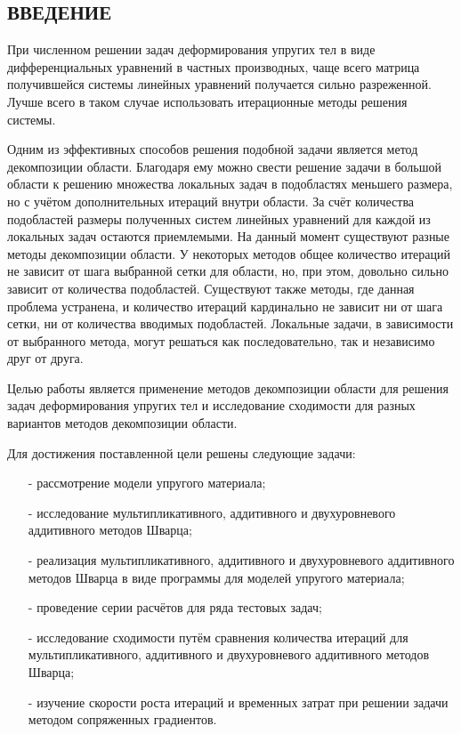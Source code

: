 \documentclass[a4paper]{article}
\begin{document}

\renewcommand*\contentsname{\begin{center}СОДЕРЖАНИЕ\end{center}}
	
\tableofcontents

\newpage

\begin{center}
\section*{\centering ВВЕДЕНИЕ}
\end{center}

При численном решении задач деформирования упругих тел в виде дифференциальных уравнений в частных производных, чаще всего матрица получившейся системы линейных уравнений получается сильно разреженной. Лучше всего в таком случае использовать итерационные методы решения системы. 

Одним из эффективных способов решения подобной задачи является метод декомпозиции области. Благодаря ему можно свести решение задачи в большой области к решению множества локальных задач в подобластях меньшего размера, но с учётом дополнительных итераций внутри области. За счёт количества подобластей размеры полученных систем линейных уравнений для каждой из локальных задач остаются приемлемыми. На данный момент существуют разные методы декомпозиции области. У некоторых методов общее количество итераций не зависит от шага выбранной сетки для области, но, при этом, довольно сильно зависит от количества подобластей. Существуют также методы, где данная проблема устранена, и количество итераций кардинально не зависит ни от шага сетки, ни от количества вводимых подобластей. Локальные задачи, в зависимости от выбранного метода, могут решаться как последовательно, так и независимо друг от друга.

Целью работы является применение методов декомпозиции области для решения задач деформирования упругих тел и исследование сходимости для разных вариантов методов декомпозиции области.

Для достижения поставленной цели решены следующие задачи:
\begin{itemize}
\item[-]рассмотрение модели упругого материала;
\item[-]исследование мультипликативного, аддитивного и двухуровневого аддитивного методов Шварца;
\item[-]реализация мультипликативного, аддитивного и двухуровневого аддитивного методов Шварца в виде программы для моделей упругого материала;
\item[-]проведение серии расчётов для ряда тестовых задач;
\item[-]исследование сходимости путём сравнения количества итераций для мультипликативного, аддитивного и двухуровневого аддитивного методов Шварца;
\item[-]изучение скорости роста итераций и временных затрат при решении задачи методом сопряженных градиентов.
\end{itemize}
\end{document}
